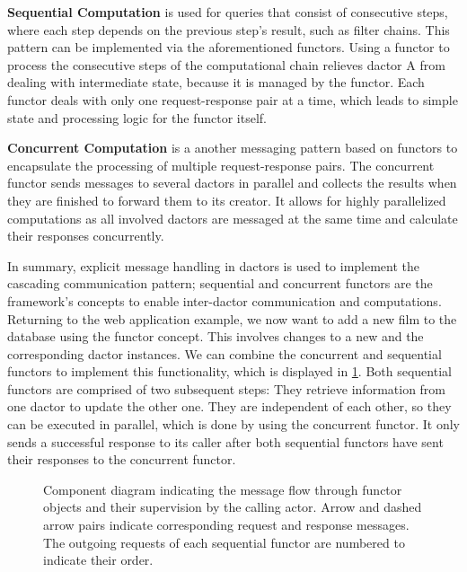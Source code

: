       \textbf{Sequential Computation} is used for queries that consist of consecutive steps, where each step depends on the previous step's result, such as filter chains.
      This pattern can be implemented via the aforementioned \glspl{functor}.
      Using a \gls{functor} to process the consecutive steps of the computational chain relieves \gls{dactor} A from dealing with intermediate state, because it is managed by the \gls{functor}.
      Each \gls{functor} deals with only one request-response pair at a time, which leads to simple state and processing logic for the \gls{functor} itself.

      \textbf{Concurrent Computation} is a another messaging pattern based on \glspl{functor} to encapsulate the processing of multiple request-response pairs.
      The concurrent \gls{functor} sends messages to several \glspl{dactor} in parallel and collects the results when they are finished to forward them to its creator.
      It allows for highly parallelized computations as all involved \glspl{dactor} are messaged at the same time and calculate their responses concurrently.
      
    In summary, explicit message handling in \glspl{dactor} is used to implement the cascading communication pattern; sequential and concurrent \glspl{functor} are the framework's concepts to enable inter-\gls{dactor} communication and computations.
    Returning to the web application example, we now want to add a new film to the database using the \gls{functor} concept.
    This involves changes to a new  and the corresponding  \gls{dactor} instances.
    We can combine the concurrent and sequential \glspl{functor} to implement this functionality, which is displayed in \cref{fig:functor_diagram}.
    Both sequential \glspl{functor} are comprised of two subsequent steps:
    They retrieve information from one \gls{dactor} to update the other one.
    They are independent of each other, so they can be executed in parallel, which is done by using the concurrent \gls{functor}.
    It only sends a successful response to its caller after both sequential \glspl{functor} have sent their responses to the concurrent \gls{functor}.
    
    \begin{figure}
      \centering
      
      \caption{Component diagram indicating the message flow through \gls{functor} objects and their supervision by the calling actor. Arrow and dashed arrow pairs indicate corresponding request and response messages. The outgoing requests of each sequential \gls{functor} are numbered to indicate their order.}
      \label{fig:functor_diagram}
    \end{figure}      
      
